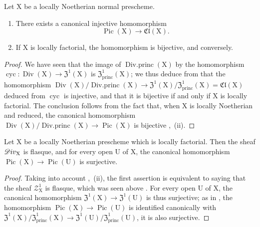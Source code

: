 \begin{corollary}[21.6.10]
\label{IV.21.6.10}
Let $\mathrm{X}$ be a locally Noetherian \textup{normal} prescheme.
\begin{enumerate}[label=\textup{(\roman*)}]
  \item There exists a canonical injective homomorphism
\[
\label{IV.21.6.10.1}
  \operatorname{Pic}(\mathrm{X})\to\mathfrak{Cl}(\mathrm{X}).
  \tag{21.6.10.1}
\]

  \item If $\mathrm{X}$ is locally factorial, the homomorphism  is bijective, and conversely.
\end{enumerate}
\end{corollary}

\begin{proof}
We have seen  that the image of $\operatorname{Div.princ}(\mathrm{X})$ by the homomorphism $\operatorname{cyc}:\operatorname{Div}(\mathrm{X})\to\mathfrak{Z}^1(\mathrm{X})$ is $\mathfrak{Z}^1_\mathrm{princ}(\mathrm{X})$;
we thus deduce from  that the homomorphism $\operatorname{Div}(\mathrm{X})/\operatorname{Div.princ}(\mathrm{X})\to\mathfrak{Z}^1(\mathrm{X})/\mathfrak{Z}^1_\mathrm{princ}(\mathrm{X})=\mathfrak{Cl}(\mathrm{X})$ deduced from $\operatorname{cyc}$ is injective, and that it is bijective if and only if $\mathrm{X}$ is locally factorial.
The conclusion follows from the fact that, when $\mathrm{X}$ is locally Noetherian and reduced, the canonical homomorphism $\operatorname{Div}(\mathrm{X})/\operatorname{Div.princ}(\mathrm{X})\to\operatorname{Pic}(\mathrm{X})$  is bijective ,{}~(ii).
\end{proof}

\begin{corollary}[21.6.11]
\label{IV.21.6.11}
Let $\mathrm{X}$ be a locally Noetherian prescheme which is locally factorial.
Then the sheaf $\mathscr{D}iv_\mathrm{X}$ is flasque, and for every open $\mathrm{U}$ of $\mathrm{X}$, the canonical homomorphism $\operatorname{Pic}(\mathrm{X})\to\operatorname{Pic}(\mathrm{U})$ is surjective.
\end{corollary}

\begin{proof}
Taking into account ,{}~(ii), the first assertion is equivalent to saying that the sheaf $\mathscr{Z}_\mathrm{X}^1$ is flasque, which was seen above .
For every open $\mathrm{U}$ of $\mathrm{X}$, the canonical homomorphism $\mathfrak{Z}^1(\mathrm{X})\to\mathfrak{Z}^1(\mathrm{U})$ is thus surjective;
as in , the homomorphism $\operatorname{Pic}(\mathrm{X})\to\operatorname{Pic}(\mathrm{U})$ is identified canonically with $\mathfrak{Z}^1(\mathrm{X})/\mathfrak{Z}^1_\mathrm{princ}(\mathrm{X})\to\mathfrak{Z}^1(\mathrm{U})/\mathfrak{Z}^1_\mathrm{princ}(\mathrm{U})$, it is also surjective.
\end{proof}

